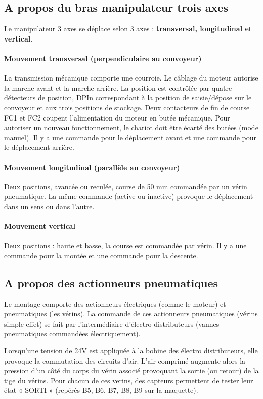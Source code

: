 \documentclass[11pt, multicol]{article}
\begin{document}
\subsection{A propos du bras manipulateur trois axes}
Le manipulateur 3 axes se déplace selon 3 axes : \textbf{transversal, longitudinal et vertical}.

\paragraph{Mouvement transversal (perpendiculaire au convoyeur) }La transmission mécanique comporte une courroie. Le câblage du moteur autorise la marche
avant et la marche arrière. La position est contrôlée par quatre détecteurs de position, DPIn
correspondant à la position de saisie/dépose sur le convoyeur et aux trois positions de stockage.
Deux contacteurs de fin de course FC1 et FC2 coupent l’alimentation du moteur en butée
mécanique. Pour autoriser un nouveau fonctionnement, le chariot doit être écarté des butées
(mode manuel).
Il y a une commande pour le déplacement avant et une commande pour le déplacement arrière.

\paragraph{Mouvement longitudinal (parallèle au convoyeur)}
Deux positions, avancée ou reculée, course de 50 mm commandée par un vérin pneumatique.
La même commande (active ou inactive) provoque le déplacement dans un sens ou dans l’autre.

\paragraph{Mouvement vertical }Deux positions : haute et basse, la course est commandée par vérin.
Il y a une commande pour la montée et une commande pour la descente.


\subsection{A propos des actionneurs pneumatiques}
Le montage comporte des actionneurs électriques (comme le moteur) et pneumatiques (les vérins).
La commande de ces actionneurs pneumatiques (vérins simple effet) se fait par l’intermédiaire
d’électro distributeurs (vannes pneumatiques commandées électriquement).

Lorsqu'une tension de 24V est appliquée à la bobine des électro distributeurs, elle provoque la commutation des circuits d’air. L'air comprimé augmente alors la pression d'un côté du corps du vérin associé provoquant la sortie (ou retour) de la tige du vérins.
Pour chacun de ces verins, des capteurs permettent de tester leur état « SORTI » (repérés B5, B6, B7, B8, B9 sur la maquette).
\end{document}
